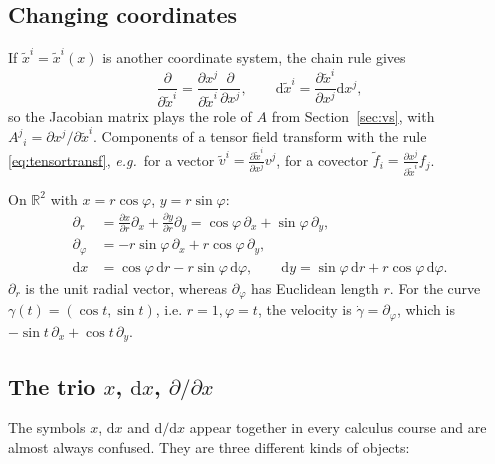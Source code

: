 \documentclass[11pt,a4paper]{article}
\numberwithin{equation}{section}
\theoremstyle{definition}
\theoremstyle{plain}
\newcommand{\R}{\mathbb{R}}
\newcommand{\dd}{\mathrm{d}}
\newcommand{\eg}{\emph{e.g.}\ }
\begin{document}
\subsection{Changing coordinates}\label{sec:changecoords}
If $\tilde x^i=\tilde x^i(x)$ is another coordinate system, the chain rule gives
\begin{equation}\label{eq:basistransf}
\frac{\partial}{\partial\tilde x^i}=\frac{\partial x^j}{\partial\tilde x^i}\frac{\partial}{\partial x^j},\qquad
\dd\tilde x^i=\frac{\partial\tilde x^i}{\partial x^j}\dd x^j,
\end{equation}
so the Jacobian matrix plays the role of $A$ from Section~\ref{sec:vs}, with $A^j{}_i=\partial x^j/\partial\tilde x^i$. Components of a tensor field transform with the rule \eqref{eq:tensortransf}, \eg for a vector $\tilde v^i=\frac{\partial\tilde x^i}{\partial x^j}v^j$, for a covector $\tilde f_i=\frac{\partial x^j}{\partial\tilde x^i}f_j$.

\begin{example}\label{ex:polarbasis}
On $\R^2$ with $x=r\cos\varphi$, $y=r\sin\varphi$:
\begin{align*}
\partial_r&=\frac{\partial x}{\partial r}\partial_x+\frac{\partial y}{\partial r}\partial_y=\cos\varphi\,\partial_x+\sin\varphi\,\partial_y,\\
\partial_\varphi&=-r\sin\varphi\,\partial_x+r\cos\varphi\,\partial_y,\\
\dd x&=\cos\varphi\,\dd r-r\sin\varphi\,\dd\varphi,\qquad \dd y=\sin\varphi\,\dd r+r\cos\varphi\,\dd\varphi .
\end{align*}
$\partial_r$ is the unit radial vector, whereas $\partial_\varphi$ has Euclidean length $r$. For the curve $\gamma(t)=(\cos t,\sin t)$, i.e. $r=1,\varphi=t$, the velocity is $\dot\gamma=\partial_\varphi$, which is $-\sin t\,\partial_x+\cos t\,\partial_y$. \checkmark
\end{example}


\subsection{The trio $x$, $\dd x$, $\partial/\partial x$}\label{sec:trio}

The symbols $x$, $\dd x$ and $\dd/\dd x$ appear together in every calculus course and are almost always confused. They are three
different kinds of objects:
\end{document}
